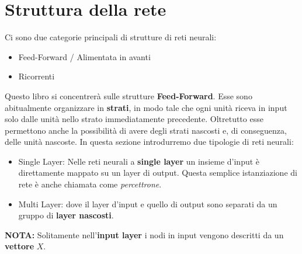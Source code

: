 \section{Struttura della rete}
Ci sono due categorie principali di strutture di reti neurali:
\begin{itemize}
	\item Feed-Forward / Alimentata in avanti
	\item Ricorrenti
\end{itemize}
Questo libro si concentrerà sulle strutture \textbf{Feed-Forward}. Esse sono abitualmente organizzare in \textbf{strati}, in modo tale che ogni unità riceva in input solo dalle unità nello strato immediatamente precedente. Oltretutto esse permettono anche la possibilità di avere degli strati nascosti e, di conseguenza, delle unità nascoste. In questa sezione introdurremo due tipologie di reti neurali:
\begin{itemize}
	\item Single Layer: 
	      Nelle reti neurali a \textbf{single layer} un insieme d'input è direttamente mappato su un layer di output. Questa semplice istanziazione di rete è anche chiamata come \textit{percettrone}.
	\item Multi Layer: dove il layer d'input e quello di output sono separati da un gruppo di \textbf{layer nascosti}. 
\end{itemize}
\textbf{NOTA:} Solitamente nell'\textbf{input layer} i nodi in input vengono descritti da un \textbf{vettore} $X$.
